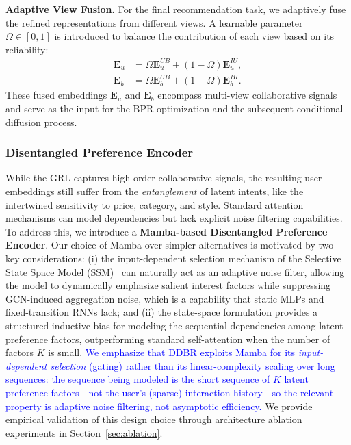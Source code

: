 \documentclass[lettersize,journal]{IEEEtran}
\newcommand{\revise}[1]{\textcolor{blue}{#1}}
\begin{document}
\noindent \textbf{Adaptive View Fusion.}
For the final recommendation task, we adaptively fuse the refined representations from different views. A learnable parameter $\Omega \in [0,1]$ is introduced to balance the contribution of each view based on its reliability:
\begin{equation}
\begin{aligned}
    \mathbf{E}_u &= \Omega \mathbf{E}_u^{UB} + (1 - \Omega) \mathbf{E}_u^{IU}, \\
    \mathbf{E}_b &= \Omega \mathbf{E}_b^{UB} + (1 - \Omega) \mathbf{E}_b^{BI}.
\end{aligned}
\end{equation}
These fused embeddings $\mathbf{E}_u$ and $\mathbf{E}_b$ encompass multi-view collaborative signals and serve as the input for the BPR optimization and the subsequent conditional diffusion process.

\subsubsection{Disentangled Preference Encoder}
\label{sec:disentangled_mamba}
While the GRL captures high-order collaborative signals, the resulting user embeddings still suffer from the \textit{entanglement} of latent intents, like the intertwined sensitivity to price, category, and style. Standard attention mechanisms can model dependencies but lack explicit noise filtering capabilities. To address this, we introduce a \textbf{Mamba-based Disentangled Preference Encoder}. Our choice of Mamba over simpler alternatives is motivated by two key considerations: (i) the input-dependent selection mechanism of the Selective State Space Model (SSM)~\cite{gu2024mamba} can naturally act as an adaptive noise filter, allowing the model to dynamically emphasize salient interest factors while suppressing GCN-induced aggregation noise, which is a capability that static MLPs and fixed-transition RNNs lack; and (ii) the state-space formulation provides a structured inductive bias for modeling the sequential dependencies among latent preference factors, outperforming standard self-attention when the number of factors $K$ is small. \revise{We emphasize that DDBR exploits Mamba for its \emph{input-dependent selection} (gating) rather than its linear-complexity scaling over long sequences: the sequence being modeled is the short sequence of $K$ latent preference factors---not the user's (sparse) interaction history---so the relevant property is adaptive noise filtering, not asymptotic efficiency.} We provide empirical validation of this design choice through architecture ablation experiments in Section~\ref{sec:ablation}.
\end{document}
